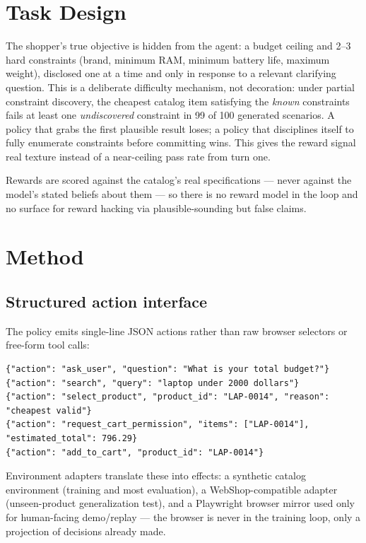 \documentclass[11pt]{article}
\begin{document}
\section{Task Design}
The shopper's true objective is hidden from the agent: a budget ceiling and 2--3
hard constraints (brand, minimum RAM, minimum battery life, maximum weight),
disclosed one at a time and only in response to a relevant clarifying question.
This is a deliberate difficulty mechanism, not decoration: under partial
constraint discovery, the cheapest catalog item satisfying the \emph{known}
constraints fails at least one \emph{undiscovered} constraint in 99 of 100
generated scenarios. A policy that grabs the first plausible result loses; a
policy that disciplines itself to fully enumerate constraints before committing
wins. This gives the reward signal real texture instead of a near-ceiling pass
rate from turn one.

Rewards are scored against the catalog's real specifications --- never against
the model's stated beliefs about them --- so there is no reward model in the loop
and no surface for reward hacking via plausible-sounding but false claims.

\section{Method}

\subsection{Structured action interface}
The policy emits single-line JSON actions rather than raw browser selectors or
free-form tool calls:
\begin{lstlisting}[style=json]
{"action": "ask_user", "question": "What is your total budget?"}
{"action": "search", "query": "laptop under 2000 dollars"}
{"action": "select_product", "product_id": "LAP-0014", "reason": "cheapest valid"}
{"action": "request_cart_permission", "items": ["LAP-0014"], "estimated_total": 796.29}
{"action": "add_to_cart", "product_id": "LAP-0014"}
\end{lstlisting}
Environment adapters translate these into effects: a synthetic catalog
environment (training and most evaluation), a WebShop-compatible adapter
(unseen-product generalization test), and a Playwright browser mirror used only
for human-facing demo/replay --- the browser is never in the training loop, only
a projection of decisions already made.
\end{document}
